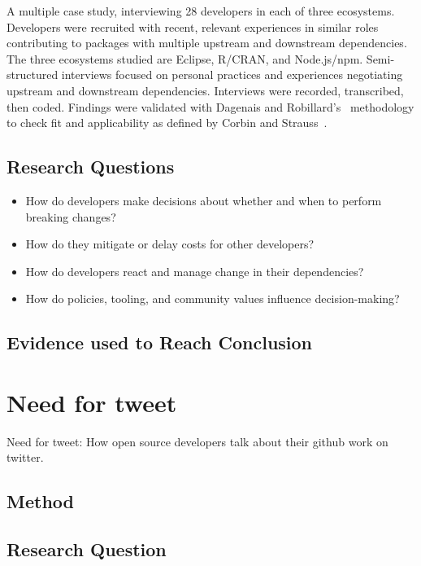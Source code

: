\documentclass[conference]{IEEEtran}
\begin{document}
A multiple case study, interviewing 28 developers in each of three ecosystems. Developers were recruited with recent, relevant experiences in similar roles contributing to packages with multiple upstream and downstream dependencies.
The three ecosystems studied are Eclipse, R/CRAN, and Node.js/npm.
Semi-structured interviews focused on personal practices and experiences negotiating upstream and downstream dependencies.
Interviews were recorded, transcribed, then coded.
Findings were validated with Dagenais and Robillard's~\cite{dagenais2010creating} methodology to check fit and applicability as defined by Corbin and Strauss~\cite{corbin2014basics}.

\subsection{Research Questions}

\begin{itemize}
    \item How do developers make decisions about whether and when to perform breaking changes?
    \item How do they mitigate or delay costs for other developers?
    \item How do developers react and manage change in their dependencies?
    \item How do policies, tooling, and community values influence decision-making?
\end{itemize}

\subsection{Evidence used to Reach Conclusion}


\section{Need for tweet}

Need for tweet: How open source developers talk about their github work on twitter.~\cite{fang2020need}

\subsection{Method}

\subsection{Research Question}
\end{document}
